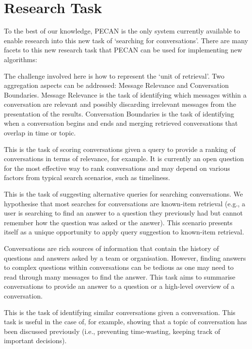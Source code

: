 \section{Research Task}
\label{sec:importance}

To the best of our knowledge, PECAN is the only system currently available to enable research into this new task of `searching for conversations'. There are many facets to this new research task that PECAN can be used for implementing new algorithms:

\begin{description}[noitemsep,leftmargin=8pt]
\item[Conversation Aggregations:] The challenge involved here is how to represent the `unit of retrieval'. Two aggregation aspects can be addressed: Message Relevance and Conversation Boundaries. Message Relevance is the task of identifying which messages within a conversation are relevant and possibly discarding irrelevant messages from the presentation of the results. Conversation Boundaries is the task of identifying when a conversation begins and ends and merging retrieved conversations that overlap in time or topic.
\item[Conversation Scoring:] This is the task of scoring conversations given a query to provide a ranking of conversations in terms of relevance, for example. It is currently an open question for the most effective way to rank conversations and may depend on various factors from typical search scenarios, such as timeliness.
\item[Query Suggestion:] This is the task of suggesting alternative queries for searching conversations. We hypothesise that most searches for conversations are known-item retrieval (e.g., a user is searching to find an answer to a question they previously had but cannot remember how the question was asked or the answer). This scenario presents itself as a unique opportunity to apply query suggestion to known-item retrieval.
\item[Conversation Summarisation:] Conversations are rich sources of information that contain the history of questions and answers asked by a team or organisation. However, finding answers to complex questions within conversations can be tedious as one may need to read through many messages to find the answer. This task aims to summarise conversations to provide an answer to a question or a high-level overview of a conversation.
\item[Related Conversations:] This is the task of identifying similar conversations given a conversation. This task is useful in the case of, for example, showing that a topic of conversation has been discussed previously (i.e., preventing time-wasting, keeping track of important decisions).
\end{description}
 
 